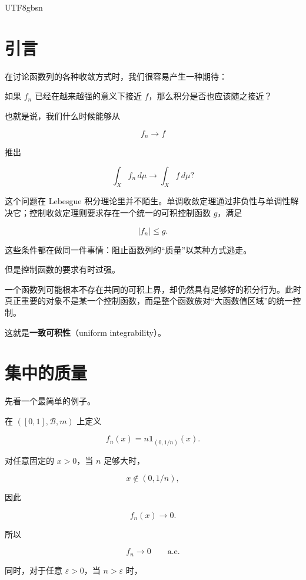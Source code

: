 \documentclass[11pt]{article}
\begin{document}
\begin{CJK*}{UTF8}{gbsn}

\maketitle


\section*{引言}


在讨论函数列的各种收敛方式时，我们很容易产生一种期待：

如果 $f_n$ 已经在越来越强的意义下接近 $f$，那么积分是否也应该随之接近？

也就是说，我们什么时候能够从

\[
f_n\to f
\]

推出

\[
\int_X f_n\,d\mu
\longrightarrow
\int_X f\,d\mu?
\]

这个问题在 Lebesgue 积分理论里并不陌生。单调收敛定理通过非负性与单调性解决它；控制收敛定理则要求存在一个统一的可积控制函数 $g$，满足

\[
|f_n|\leq g.
\]

这些条件都在做同一件事情：阻止函数列的“质量”以某种方式逃走。

但是控制函数的要求有时过强。

一个函数列可能根本不存在共同的可积上界，却仍然具有足够好的积分行为。此时真正重要的对象不是某一个控制函数，而是整个函数族对“大函数值区域”的统一控制。

这就是\textbf{一致可积性}（uniform integrability）。


\section{集中的质量}


先看一个最简单的例子。

在 $([0,1],\mathcal B,m)$ 上定义

\[
f_n(x)
=
n\mathbf 1_{(0,1/n)}(x).
\]

对任意固定的 $x>0$，当 $n$ 足够大时，

\[
x\notin(0,1/n),
\]

因此

\[
f_n(x)\to0.
\]

所以

\[
f_n\to0
\qquad\text{a.e.}
\]

同时，对于任意 $\varepsilon>0$，当 $n>\varepsilon$ 时，


\end{CJK*}
\end{document}
